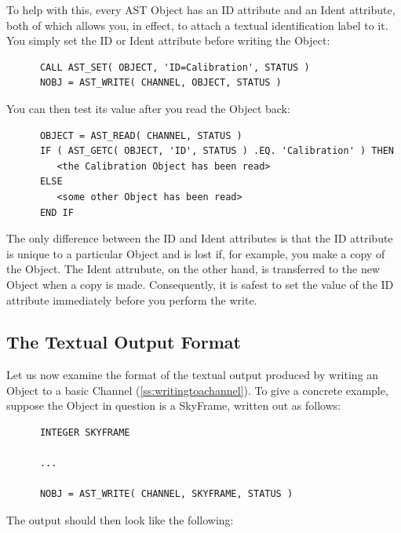 \documentclass[twoside,11pt]{article}
\newcommand{\htmlref}[2]{#1}
\newcommand{\secref}[1]{\S\ref{#1}}
\renewcommand{\secref}[1]{\ref{#1}}
\begin{document}
To help with this, every AST \htmlref{Object}{Object} has an \htmlref{ID}{ID} attribute and an \htmlref{Ident}{Ident}
attribute, both of which allows you, in effect, to attach a textual
identification label to it. You simply set the ID or Ident attribute before
writing the Object:

\small
\begin{verbatim}
      CALL AST_SET( OBJECT, 'ID=Calibration', STATUS )
      NOBJ = AST_WRITE( CHANNEL, OBJECT, STATUS )
\end{verbatim}
\normalsize

You can then test its value after you read the Object back:

\small
\begin{verbatim}
      OBJECT = AST_READ( CHANNEL, STATUS )
      IF ( AST_GETC( OBJECT, 'ID', STATUS ) .EQ. 'Calibration' ) THEN
         <the Calibration Object has been read>
      ELSE
         <some other Object has been read>
      END IF
\end{verbatim}
\normalsize

The only difference between the ID and Ident attributes is that the ID
attribute is unique to a particular Object and is lost if, for example,
you make a copy of the Object. The Ident attrubute, on the other hand, is
transferred to the new Object when a copy is made. Consequently, it is
safest to set the value of the ID attribute immediately before you
perform the write.

\subsection{\label{ss:textualoutputformat}The Textual Output Format} 

Let us now examine the format of the textual output produced by
writing an \htmlref{Object}{Object} to a basic \htmlref{Channel}{Channel}
(\secref{ss:writingtoachannel}). To give a concrete example, suppose
the Object in question is a \htmlref{SkyFrame}{SkyFrame}, written out as follows:

\small
\begin{verbatim}
      INTEGER SKYFRAME

      ...

      NOBJ = AST_WRITE( CHANNEL, SKYFRAME, STATUS )
\end{verbatim}
\normalsize

The output should then look like the following:
\end{document}
